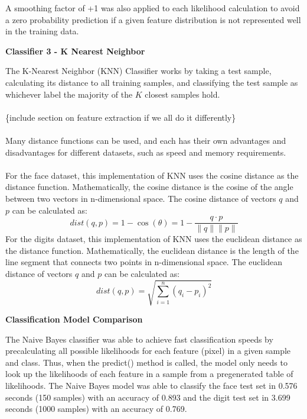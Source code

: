 \documentclass[11pt]{article}
\begin{document}
    A smoothing factor of +1 was also applied to each likelihood calculation to avoid a zero probability prediction if a given feature distribution is not represented well in the training data.
    
    \begin{center}
        \Large
        \textbf{Classifier 3 - K Nearest Neighbor}
    \end{center}
    \normalsize
    The K-Nearest Neighbor (KNN) Classifier works by taking a test sample, calculating its
    distance to all training samples, and classifying the test sample as whichever label
    the majority of the $K$ closest samples hold.\\\\
    \{include section on feature extraction if we all do it differently\}\\\\
    Many distance functions can be used, and each has their own advantages and disadvantages for
    different datasets, such as speed and memory requirements.\\\\
    For the face dataset, this implementation of KNN uses the cosine distance as the distance function.
    Mathematically, the cosine distance is the cosine of the angle between two vectors in n-dimensional space.
    The cosine distance of vectors $q$ and $p$ can be calculated as:
    \[dist\left(q, p\right) = 1-\cos(\theta) = 1-\frac{q \cdot p}{\|q\|\|p\|}\]
    For the digits dataset, this implementation of KNN uses the euclidean distance as the distance function.
    Mathematically, the euclidean distance is the length of the line segment that connects two points in n-dimensional space.
    The euclidean distance of vectors $q$ and $p$ can be calculated as:
    \[dist\left(q, p\right) = \sqrt{\sum_{i=1}^{n}\left(q_i-p_i\right)^2}\]

    \begin{center}
        \Large
        \textbf{Classification Model Comparison}
    \end{center}
    \normalsize
    
    The Naive Bayes classifier was able to achieve fast classification speeds by precalculating all possible likelihoods for each feature (pixel) in a given sample and class. Thus, when the predict() method is called, the model only needs to look up the likelihoods of each feature in a sample from a pregenerated table of likelihoods. The Naive Bayes model was able to classify the face test set in 0.576 seconds (150 samples) with an accuracy of 0.893 and the digit test set in 3.699 seconds (1000 samples) with an accuracy of 0.769.
\end{document}

